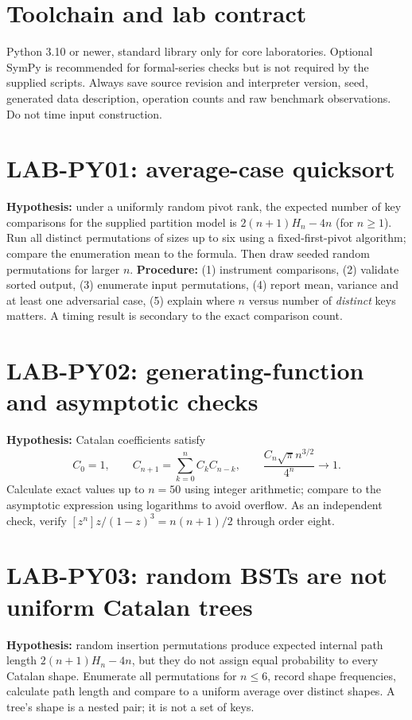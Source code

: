 \documentclass[11pt]{article}
\begin{document}
\makedoctocpage

\section{Toolchain and lab contract}
Python 3.10 or newer, standard library only for core laboratories. Optional SymPy is recommended for formal-series checks but is not required by the supplied scripts. Always save source revision and interpreter version, seed, generated data description, operation counts and raw benchmark observations. Do not time input construction.
\section{LAB-PY01: average-case quicksort}
\textbf{Hypothesis:} under a uniformly random pivot rank, the expected number of key comparisons for the supplied partition model is $2(n+1)H_n-4n$ (for $n\ge1$). Run all distinct permutations of sizes up to six using a fixed-first-pivot algorithm; compare the enumeration mean to the formula. Then draw seeded random permutations for larger $n$.
\textbf{Procedure:} (1) instrument comparisons, (2) validate sorted output, (3) enumerate input permutations, (4) report mean, variance and at least one adversarial case, (5) explain where $n$ versus number of \emph{distinct} keys matters. A timing result is secondary to the exact comparison count.
\section{LAB-PY02: generating-function and asymptotic checks}
\textbf{Hypothesis:} Catalan coefficients satisfy\[C_0=1,\qquad C_{n+1}=\sum_{k=0}^n C_kC_{n-k},\qquad \frac{C_n\sqrt{\pi}n^{3/2}}{4^n}\to1.\]Calculate exact values up to $n=50$ using integer arithmetic; compare to the asymptotic expression using logarithms to avoid overflow. As an independent check, verify $[z^n]z/(1-z)^3=n(n+1)/2$ through order eight.
\section{LAB-PY03: random BSTs are not uniform Catalan trees}
\textbf{Hypothesis:} random insertion permutations produce expected internal path length $2(n+1)H_n-4n$, but they do not assign equal probability to every Catalan shape. Enumerate all permutations for $n\le6$, record shape frequencies, calculate path length and compare to a uniform average over distinct shapes. A tree's shape is a nested pair; it is not a set of keys.
\end{document}

